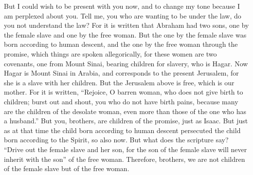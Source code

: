 \begin{biblechapter}
\verse But I could wish to be present with you now, and to change my tone because I am perplexed about you.
 Tell me, you who are wanting to be under the law, do you not understand the law?
\verse For it is written that Abraham had two sons, one by the female slave and one by the free woman.
\verse But the one by the female slave was born according to human descent, and the one by the free woman through the promise,
\verse which things are spoken allegorically, for these women are two covenants, one from Mount Sinai, bearing children for slavery, who is Hagar.
\verse Now Hagar is Mount Sinai in Arabia, and corresponds to the present Jerusalem, for she is a slave with her children.
\verse But the Jerusalem above is free, which is our mother.
\verse For it is written, “Rejoice, O barren woman, who does not give birth to children; 
burst out and shout, you who do not have birth pains, 
because many are the children of the desolate woman, 
even more than those of the one who has a husband.”
\verse But you, brothers, are children of the promise, just as Isaac.
\verse But just as at that time the child born according to human descent persecuted the child born according to the Spirit, so also now.
\verse But what does the scripture say? “Drive out the female slave and her son, for the son of the female slave will never inherit with the son” of the free woman.
\verse Therefore, brothers, we are not children of the female slave but of the free woman.
\end{biblechapter}

